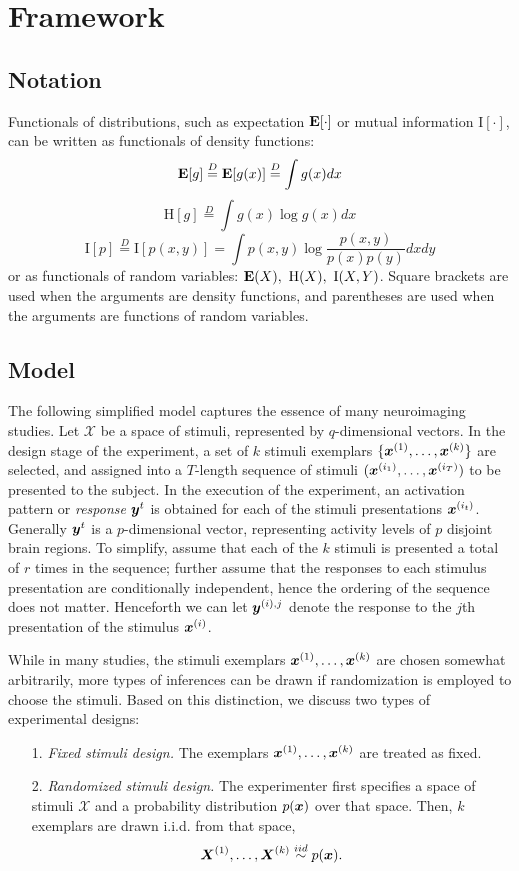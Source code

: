 \documentclass[12pt]{article}
\begin{document}
\section{Framework}

\subsection{Notation}

Functionals of distributions, such as expectation $\textbf{E}[\cdot]$ or mutual information $\text{I}[\cdot]$, can be written as functionals of density functions:
\[
\textbf{E}[g] \stackrel{D}{=} \textbf{E}[g(x)] \stackrel{D}{=} \int g(x) dx
\]
\[
\text{H}[g]  \stackrel{D}{=} \int g(x) \log g(x) dx
\]
\[
\text{I}[p]  \stackrel{D}{=} \text{I}[p(x,y)] = \int p(x, y) \log \frac{p(x,y)}{p(x) p(y)} dx dy
\]
or as functionals of random variables: $\textbf{E}(X), \ \text{H}(X), \ \text{I}(X, Y)$.
Square brackets are used when the arguments are density functions, and parentheses are used when the arguments are functions of random variables.

\subsection{Model}

The following simplified model captures the essence of many
neuroimaging studies.  Let $\mathcal{X}$ be a space of stimuli,
represented by $q$-dimensional vectors.  In the design stage of the
experiment, a set of $k$ stimuli exemplars $\{\boldsymbol{x}^{(1)},\hdots, \boldsymbol{x}^{(k)}\}$ are
selected, and assigned into a $T$-length sequence of stimuli $(
\boldsymbol{x}^{(i_1)},\hdots, \boldsymbol{x}^{(i_T)} )$ to be presented to the subject.  In the
execution of the experiment, an activation pattern or \emph{response}
$\boldsymbol{y}^{t}$ is obtained for each of the stimuli presentations $\boldsymbol{x}^{(i_t)}$.
Generally $\boldsymbol{y}^t$ is a $p$-dimensional vector, representing activity
levels of $p$ disjoint brain regions.  To simplify, assume that each
of the $k$ stimuli is presented a total of $r$ times in the sequence;
further assume that the responses to each stimulus presentation are
conditionally independent, hence the ordering of the sequence does not
matter.  Henceforth we can let $\boldsymbol{y}^{(i),j}$ denote the response to the
$j$th presentation of the stimulus $\boldsymbol{x}^{(i)}$.

While in many studies, the stimuli exemplars $\boldsymbol{x}^{(1)},\hdots,\boldsymbol{x}^{(k)}$
are chosen somewhat arbitrarily, more types of inferences can be drawn
if randomization is employed to choose the stimuli.
Based on this distinction, we discuss two types of experimental designs:
\begin{itemize}
\item[1.] \emph{Fixed stimuli design.}
The exemplars $\boldsymbol{x}^{(1)},\hdots, \boldsymbol{x}^{(k)}$ are treated as fixed.
\item[2.] \emph{Randomized stimuli design.}
The experimenter first specifies a space of stimuli $\mathcal{X}$
and a probability distribution $p(\boldsymbol{x})$ over that space.
Then, $k$ exemplars are drawn i.i.d. from that space,
\[
\boldsymbol{X}^{(1)},\hdots, \boldsymbol{X}^{(k)} \stackrel{iid}{\sim} p(\boldsymbol{x}).
\]
\end{itemize}
\end{document}
